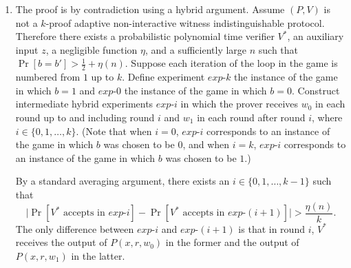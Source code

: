\documentclass[draft]{article}
\newcommand{\cid}{\overset{c}{\simeq}}
\newcommand{\getr}{\overset{R}{\gets}}
\newcommand{\getrsingle}{\getr\{0, 1\}}
\newcommand{\getrpoly}{\getrsingle^{poly(n)}}
\begin{document}
\begin{enumerate}
\begin{enumerate}
  \item I don't know.
  \end{enumerate}
\item
  The proof is by contradiction using a hybrid argument.
  Assume $(P, V)$ is not a $k$-proof adaptive non-interactive witness indistinguishable protocol.
  Therefore there exists a probabilistic polynomial time verifier $V^*$, an auxiliary input $z$, a negligible function $\eta$, and a sufficiently large $n$ such that $\Pr[b=b'] > \frac{1}{2} + \eta(n)$.
  Suppose each iteration of the loop in the game is numbered from $1$ up to $k$.
  Define experiment $exp\mbox{-}k$ the instance of the game in which $b=1$ and $exp\mbox{-}0$ the instance of the game in which $b=0$.
  Construct intermediate hybrid experiments $exp\mbox{-}i$ in which the prover receives $w_0$ in each round up to and including round $i$ and $w_1$ in each round after round $i$, where $i\in\{0, 1, \ldots, k\}$.
  (Note that when $i=0$, $exp\mbox{-}i$ corresponds to an instance of the game in which $b$ was chosen to be $0$, and when $i=k$, $exp\mbox{-}i$ corresponds to an instance of the game in which $b$ was chosen to be $1$.)

  By a standard averaging argument, there exists an $i\in\{0,1,\ldots, k-1\}$ such that
  \begin{displaymath}
    \big|\Pr\left[V^*\text{ accepts in } exp\mbox{-}i\right] - \Pr\left[V^*\text{ accepts in } exp\mbox{-}(i+1)\right]\big| > \frac{\eta(n)}{k}.
  \end{displaymath}
  The only difference between $exp\mbox{-}i$ and $exp\mbox{-}(i+1)$ is that in round $i$, $V^*$ receives the output of $P(x, r, w_0)$ in the former and the output of $P(x, r, w_1)$ in the latter.


\end{enumerate}
\end{document}
